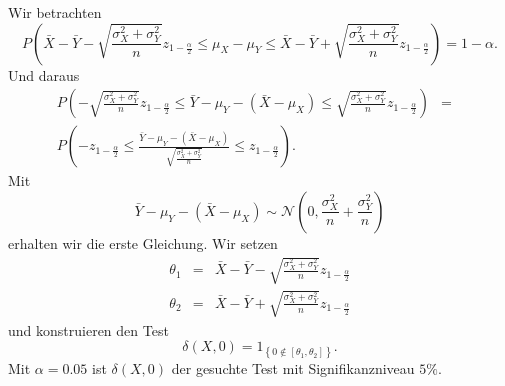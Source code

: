 \solution Wir betrachten
\begin{equation*}
    P\left( \bar X - \bar Y - \sqrt{ \frac{\sigma^2_X + \sigma^2_Y}{n}  }z_{1-\frac{\alpha}{2}} \leq \mu_X - \mu_Y \leq \bar X - \bar Y + \sqrt{ \frac{\sigma^2_X + \sigma^2_Y}{n}  }z_{1-\frac{\alpha}{2}}   \right) = 1-\alpha.
\end{equation*}
Und daraus
\begin{eqnarray*}
    P \left(  - \sqrt{ \frac{\sigma^2_X + \sigma^2_Y}{n}  }z_{1-\frac{\alpha}{2}} \leq
    \bar Y -\mu_Y -\left( \bar X - \mu_X \right) \leq 
    \sqrt{ \frac{\sigma^2_X + \sigma^2_Y}{n}  }z_{1-\frac{\alpha}{2}}
    \right) &=& \\ 
    P \left(  - z_{1-\frac{\alpha}{2}} \leq
    \frac{ \bar Y -\mu_Y -\left( \bar X - \mu_X \right)  }{  \sqrt{ \frac{\sigma^2_X + \sigma^2_Y}{n}  } } 
    \leq  z_{1-\frac{\alpha}{2}} 
    \right).
\end{eqnarray*}
Mit
\begin{equation*}
    \bar Y - \mu_Y - \left( \bar X - \mu_X \right) \sim 
    \mathcal N\left(0, \frac{\sigma^2_X}{n} + \frac{\sigma^2_Y}{n}   \right)
\end{equation*}
erhalten wir die erste Gleichung.  
Wir setzen
\begin{eqnarray*}
    \theta_1 &=& \bar X - \bar Y - \sqrt{ \frac{\sigma^2_X + \sigma^2_Y}{n}  }z_{1-\frac{\alpha}{2}} \\
    \theta_2 &=& \bar X - \bar Y + \sqrt{ \frac{\sigma^2_X + \sigma^2_Y}{n}  }z_{1-\frac{\alpha}{2}} 
\end{eqnarray*}
und konstruieren den Test
\begin{equation*}
    \delta\left( X,0 \right) = 1_{ \left\{ 0 \nin \left[ \theta_1,\theta_2 \right] \right\} }.
\end{equation*}
Mit $\alpha=0.05$ ist $\delta(X,0)$ der gesuchte Test mit Signifikanzniveau $5\%$.

